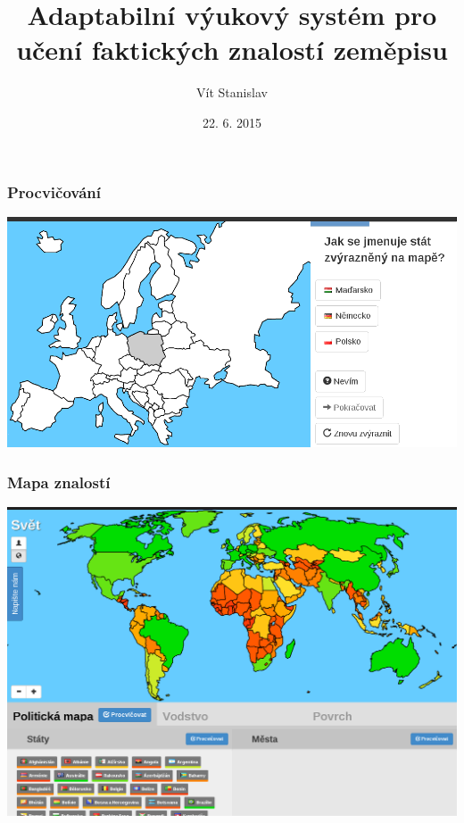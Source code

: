 \documentclass[xcolor=svgnames]{beamer}
\title[slepemapy.cz]{Adaptabilní výukový systém pro učení faktických znalostí zeměpisu}
\author{Vít Stanislav}
\institute{Fakulta informatiky Masarykovy univerzity}      %
\date{22. 6. 2015}
\begin{document}
\frame[plain]{\titlepage}
\begin{frame}
	\frametitle{Procvičování}
   \includegraphics[width=\textwidth]{img/practice-example-cs.png}
\end{frame}
\begin{frame}
	\frametitle{Mapa znalostí}
   \includegraphics[width=\textwidth]{img/knowledge-map-world.png}
\end{frame}
\end{document}

